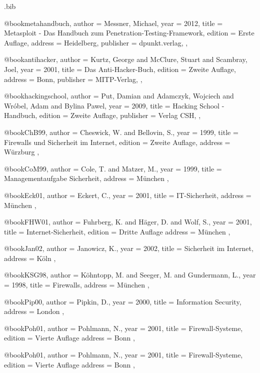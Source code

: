 \begin{filecontents}{\jobname.bib}

@book{metahandbuch,
    author = {Messner, Michael},
    year = {2012},
    title = {Metasploit - Das Handbuch zum Penetration-Testing-Framework},
    edition = {Erste Auflage},
    address = {Heidelberg},
    publisher = {dpunkt.verlag},
},

@book{antihacker,
    author = {Kurtz, George and McClure, Stuart and Scambray, Joel},
    year = {2001},
    title = {Das Anti-Hacker-Buch},
    edition = {Zweite Auflage},
    address = {Bonn},
    publisher = {MITP-Verlag},
},

@book{hackingschool,
    author = {Put, Damian and Adamczyk, Wojciech and Wróbel, Adam and Bylina Pawel},
    year = {2009},
    title = {Hacking School - Handbuch},
    edition = {Zweite Auflage},
    publisher = {Verlag CSH},
},

@book{ChB99,
    author = {Cheswick, W. and Bellovin, S.},
    year = {1999},
    title = {Firewalls und Sicherheit im Internet},
    edition = {Zweite Auflage},
    address = {Würzburg}
},

@book{CoM99,
    author = {Cole, T. and Matzer, M.},
    year = {1999},
    title = {Managementaufgabe Sicherheit},
    address = {München}
},

@book{Eck01,
    author = {Eckert, C.},
    year = {2001},
    title = {IT-Sicherheit},
    address = {München}
},

@book{FHW01,
    author = {Fuhrberg, K. and Häger, D. and Wolf, S.},
    year = {2001},
    title = {Internet-Sicherheit},
    edition = {Dritte Auflage}
    address = {München}
},

@book{Jan02,
    author = {Janowicz, K.},
    year = {2002},
    title = {Sicherheit im Internet},
    address = {Köln}
},

@book{KSG98,
    author = {Köhntopp, M. and Seeger, M. and Gundermann, L.},
    year = {1998},
    title = {Firewalls},
    address = {München}
},

@book{Pip00,
    author = {Pipkin, D.},
    year = {2000},
    title = {Information Security},
    address = {London}
},

@book{Poh01,
    author = {Pohlmann, N.},
    year = {2001},
    title = {Firewall-Systeme},
    edition = {Vierte Auflage}
    address = {Bonn}
},

@book{Poh01,
    author = {Pohlmann, N.},
    year = {2001},
    title = {Firewall-Systeme},
    edition = {Vierte Auflage}
    address = {Bonn}
},


\end{filecontents}
